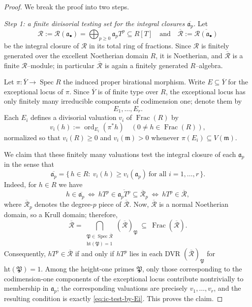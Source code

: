 \documentclass[10pt,a4paper]{amsart}
\DeclareMathOperator{\Frac}{Frac}
\DeclareMathOperator{\Spec}{Spec}
\newcommand{\R}{\mathcal{R}}
\newcommand{\abul}{{\a_\bullet}}
\newcommand{\m}{\mathfrak m}
\newcommand{\ord}{\operatorname{\mathrm{ord}}}
\renewcommand{\a}{\mathfrak{a}}
\begin{document}
\begin{proof}
	We break the proof into two steps.
	
	\smallskip
	\noindent\textit{Step 1: a finite divisorial testing set for the integral closures
		$\overline{\a_p}$.}
	Let
	\[
	\R:=\R(\abul)=\bigoplus_{p\ge 0}\a_pT^p
	\subseteq R[T]
	\quad\text{and}\quad
	\overline{\R}:=\overline{\R(\abul)}
	\]
	be the integral closure of $\R$ in its total ring of fractions.
	Since $\R$ is finitely generated over the excellent Noetherian domain $R$, it is Noetherian,
	and $\overline{\R}$ is a finite $\R$--module; in particular
	$\overline{\R}$ is again a finitely generated $R$--algebra.
	
	Let $\pi:\overline{Y}\to \Spec R$ the induced proper birational morphism.
	Write $E\subseteq \overline{Y}$ for the exceptional locus of $\pi$.
	Since $\overline{Y}$ is of finite type over $R$, the exceptional locus has only finitely many
	irreducible components of codimension one; denote them by
	\[
	E_1,\dots,E_r.
	\]
	Each $E_i$ defines a divisorial valuation $v_i$ of $\Frac(R)$ by
	\[
	v_i(h):=\ord_{E_i}(\pi^*h)\quad (0\ne h\in \Frac(R)),
	\]
	normalized so that $v_i(R)\ge 0$ and $v_i(\m)>0$ whenever $\pi(E_i)\subseteq V(\m)$.
	
	We claim that these finitely many valuations test the integral closure of each
	$\a_p$ in the sense that
	\begin{equation}\label{eq:ic-test-by-Ei}
		\overline{\a_p}
		=
		\{\,h\in R:\ v_i(h)\ge v_i(\a_p)\ \text{for all } i=1,\dots,r\,\}.
	\end{equation}
	Indeed, for $h\in R$ we have
	\[
	h\in \overline{\a_p}
	\ \Longleftrightarrow\
	hT^p \in \overline{\a_pT^p}\subseteq \overline{\R}_p
	\ \Longleftrightarrow\
	hT^p \in \overline{\R},
	\]
	where $\overline{\R}_p$ denotes the degree-$p$ piece of $\overline{\R}$.
	Now, $\overline{\R}$ is a normal Noetherian domain, so a Krull domain; therefore,
	\[
	\overline{\R}
	=
	\bigcap_{\substack{\mathfrak P\in \Spec \overline{\R}\\ \mathrm{ht}(\mathfrak P)=1}}
	(\overline{\R})_{\mathfrak P}
	\ \subseteq\ \Frac(\overline{\R}).
	\]
	Consequently, $hT^p\in \overline{\R}$ if and only if $hT^p$ lies in each DVR
	$(\overline{\R})_{\mathfrak P}$ for $\mathrm{ht}(\mathfrak P)=1$.
	Among the height-one primes $\mathfrak P$, only those corresponding to the codimension-one
	components of the exceptional locus contribute nontrivially to membership in $\a_p$; the
	corresponding valuations are precisely $v_1,\dots,v_r$, and the resulting condition is
	exactly \eqref{eq:ic-test-by-Ei}.  This proves the claim.
	

\end{proof}
\end{document}
